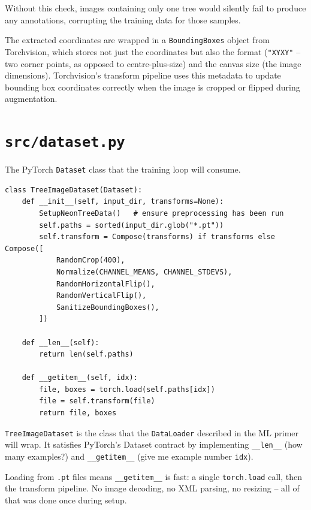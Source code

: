 \documentclass[11pt, a4paper]{article}
\newenvironment{filebox}[1]{%
  \begin{tcolorbox}[
    colback=filebg, colframe=fileframe,
    fonttitle=\bfseries\ttfamily, title=#1,
    breakable, enhanced
  ]
}{%
  \end{tcolorbox}
}
\begin{document}
Without this check, images containing only one tree would silently fail to
produce any annotations, corrupting the training data for those samples.

The extracted coordinates are wrapped in a \texttt{BoundingBoxes} object from
Torchvision, which stores not just the coordinates but also the format
(\texttt{"XYXY"} -- two corner points, as opposed to centre-plus-size) and
the canvas size (the image dimensions). Torchvision's transform pipeline uses
this metadata to update bounding box coordinates correctly when the image is
cropped or flipped during augmentation.

\section{\texttt{src/dataset.py}}

\begin{filebox}{src/dataset.py}
  The PyTorch \texttt{Dataset} class that the training loop will consume.
\end{filebox}

\begin{lstlisting}
class TreeImageDataset(Dataset):
    def __init__(self, input_dir, transforms=None):
        SetupNeonTreeData()   # ensure preprocessing has been run
        self.paths = sorted(input_dir.glob("*.pt"))
        self.transform = Compose(transforms) if transforms else Compose([
            RandomCrop(400),
            Normalize(CHANNEL_MEANS, CHANNEL_STDEVS),
            RandomHorizontalFlip(),
            RandomVerticalFlip(),
            SanitizeBoundingBoxes(),
        ])

    def __len__(self):
        return len(self.paths)

    def __getitem__(self, idx):
        file, boxes = torch.load(self.paths[idx])
        file = self.transform(file)
        return file, boxes
\end{lstlisting}

\texttt{TreeImageDataset} is the class that the \texttt{DataLoader} described
in the ML primer will wrap. It satisfies PyTorch's Dataset contract by
implementing \texttt{\_\_len\_\_} (how many examples?) and
\texttt{\_\_getitem\_\_} (give me example number \texttt{idx}).

Loading from \texttt{.pt} files means \texttt{\_\_getitem\_\_} is fast: a
single \texttt{torch.load} call, then the transform pipeline. No image
decoding, no XML parsing, no resizing -- all of that was done once during
setup.
\end{document}
